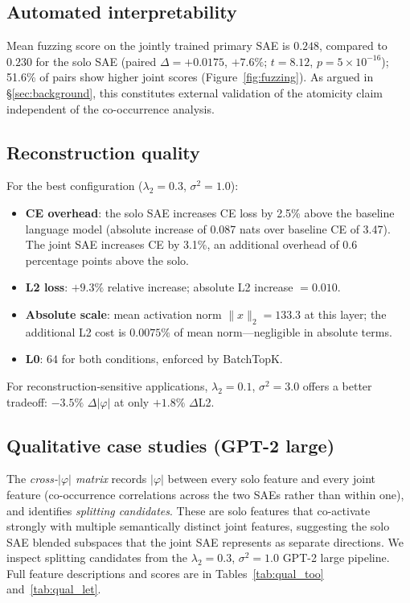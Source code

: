 \documentclass{article} %
\begin{document}
\subsection{Automated interpretability}
\label{sec:autointerp}

Mean fuzzing score on the jointly trained primary SAE is $0.248$, compared to
$0.230$ for the solo SAE (paired $\Delta=+0.0175$, $+7.6\%$;
$t=8.12$, $p=5\times10^{-16}$); 51.6\% of pairs show higher joint scores
(Figure~\ref{fig:fuzzing}).
As argued in \S\ref{sec:background}, this constitutes external validation of
the atomicity claim independent of the co-occurrence analysis.

\subsection{Reconstruction quality}
\label{sec:reconstruction}

For the best configuration ($\lambda_2\!=\!0.3$, $\sigma^2\!=\!1.0$):
\begin{itemize}[topsep=2pt, itemsep=1pt]
  \item \textbf{CE overhead}: the solo SAE increases CE loss by 2.5\% above the
    baseline language model (absolute increase of 0.087 nats over baseline CE of 3.47).
    The joint SAE increases CE by 3.1\%, an additional overhead of 0.6 percentage
    points above the solo.
  \item \textbf{L2 loss}: $+9.3\%$ relative increase; absolute L2 increase
    $= 0.010$.
  \item \textbf{Absolute scale}: mean activation norm $\|x\|_2 = 133.3$ at this
    layer; the additional L2 cost is $0.0075\%$ of mean norm---negligible in
    absolute terms.
  \item \textbf{L0}: $64$ for both conditions, enforced by BatchTopK.
\end{itemize}

For reconstruction-sensitive applications, $\lambda_2\!=\!0.1$, $\sigma^2\!=\!3.0$
offers a better tradeoff: $-3.5\%$ $\Delta|\varphi|$ at only $+1.8\%$ $\Delta$L2.

\subsection{Qualitative case studies (GPT-2 large)}
\label{sec:qualitative}

The \emph{cross-$|\varphi|$ matrix} records $|\varphi|$ between every solo
feature and every joint feature (co-occurrence correlations across the
two SAEs rather than within one), and identifies \emph{splitting candidates}.
These are solo features that co-activate strongly with multiple semantically distinct joint
features, suggesting the solo SAE blended subspaces that the joint SAE
represents as separate directions.
We inspect splitting candidates from the $\lambda_2\!=\!0.3$,
$\sigma^2\!=\!1.0$ GPT-2 large pipeline. Full feature descriptions and
scores are in Tables~\ref{tab:qual_too} and~\ref{tab:qual_let}.
\end{document}
